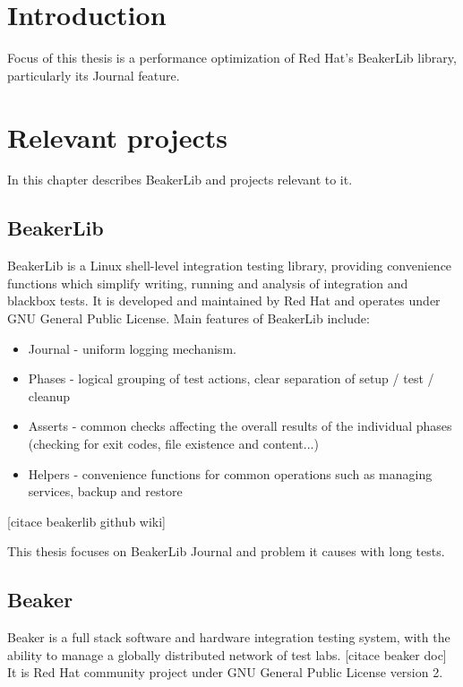 
\chapter{Introduction}

Focus of this thesis is a performance optimization of Red Hat's BeakerLib library, particularly its Journal feature. 

\chapter{Relevant projects}

In this chapter describes BeakerLib and projects relevant to it.

\section{BeakerLib}

BeakerLib is a Linux shell-level integration testing library, providing convenience functions which simplify writing, running and analysis of integration and blackbox tests. 
It is developed and maintained by Red Hat and operates under GNU General Public License.
Main features of BeakerLib include:
\begin{itemize}
\item Journal - uniform logging mechanism. 
\item Phases - logical grouping of test actions, clear separation of setup / test / cleanup
\item Asserts - common checks affecting the overall results of the individual phases (checking for exit codes, file existence and content...)
\item Helpers - convenience functions for common operations such as managing services, backup and restore 
\end{itemize}
[citace beakerlib github wiki]

This thesis focuses on BeakerLib Journal and problem it causes with long tests.


\section{Beaker}

Beaker is a full stack software and hardware integration testing system, with the ability to manage a globally distributed network of test labs.  [citace beaker doc] It is Red Hat community project under GNU General Public License version 2.

